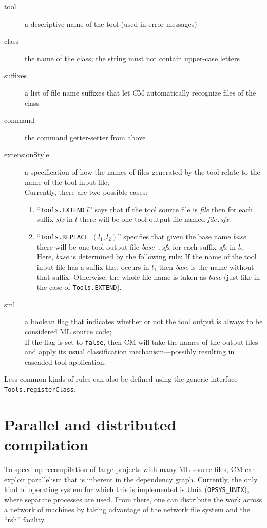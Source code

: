 \documentclass{article}
\begin{document}
\begin{description}
\item[tool] a descriptive name of the tool (used in error messages)
\item[class] the name of the class; the string must not contain
upper-case letters
\item[suffixes] a list of file name suffixes that let CM automatically
recognize files of the class
\item[command] the command getter-setter from above
\item[extensionStyle] a specification of how the names of files
generated by the tool relate to the name of the tool input file; \\
Currently, there are two possible cases:
\begin{enumerate}
\item ``{\tt Tools.EXTEND} $l$'' says that if the tool source file is
{\it file} then for each suffix {\it sfx} in $l$ there will be one tool
output file named {\it file}{\tt .}{\it sfx}.
\item ``{\tt Tools.REPLACE }$(l_1, l_2)$'' specifies that given the
base name {\it base} there will be one tool output file {\it base}{\tt
.}{\it sfx} for each suffix {\it sfx} in $l_2$.  Here, {\it base} is
determined by the following rule:  If the name of the tool input file
has a suffix that occurs in $l_1$ then {\it base} is the name without
that suffix.  Otherwise, the whole file name is taken as {\it base}
(just like in the case of {\tt Tools.EXTEND}).
\end{enumerate}
\item[sml] a boolean flag that indicates whether or not the tool
output is always to be considered ML source code; \\
If the flag is set to {\tt false}, then CM will take the names of the
output files and apply its usual classification mechanism---possibly
resulting in cascaded tool application.
\end{description}

Less common kinds of rules can also be defined using the generic
interface {\tt Tools.registerClass}.

\section{Parallel and distributed compilation}
\label{sec:parmake}

To speed up recompilation of large projects with many ML source files,
CM can exploit parallelism that is inherent in the dependency graph.
Currently, the only kind of operating system for which this is
implemented is Unix ({\tt OPSYS\_UNIX}), where separate processes are
used.  From there, one can distribute the work across a network of
machines by taking advantage of the network file system and the
``rsh'' facility.
\end{document}
